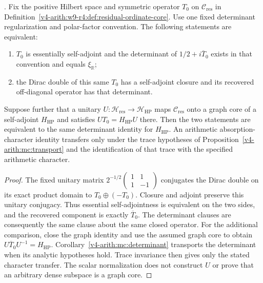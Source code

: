 \begin{theorem}
\label{v4-arith:w9-r4:thm:polyakov-dirac-normal-form}
\ClaimStatusProvedHereConditional. Fix the positive Hilbert space
and symmetric operator $T_0$ on $\mathcal C_{\mathrm{res}}$ in
Definition~\ref{v4-arith:w9-r4:def:residual-ordinate-core}.
Use one fixed determinant regularization and polar-factor convention.
The following statements are equivalent:
\begin{enumerate}
\item $T_0$ is essentially self-adjoint and the determinant of
$1/2+i\overline T_0$ exists in that convention and equals
$\xi_{\mathbb R}$;
\item the Dirac double of this same $T_0$ has a self-adjoint closure
and its recovered off-diagonal operator has that determinant.
\end{enumerate}
Suppose further that a unitary $U:\mathcal H_{\mathrm{res}}
\to\mathcal H_{\mathrm{HP}}$ maps $\mathcal C_{\mathrm{res}}$ onto
a graph core of a self-adjoint $H_{\mathrm{HP}}$ and satisfies
$UT_0=H_{\mathrm{HP}}U$ there. Then the two statements are equivalent
to the same determinant identity for $H_{\mathrm{HP}}$.
An arithmetic absorption-character identity transfers only under
the trace hypotheses of Proposition~\ref{v4-arith:mc:transport}
and the identification of that trace with the specified arithmetic
character.
\end{theorem}
\begin{proof}
The fixed unitary matrix
$2^{-1/2}\left(\begin{smallmatrix}1&1\\1&-1\end{smallmatrix}\right)$
conjugates the Dirac double on its exact product domain to
$T_0\oplus(-T_0)$. Closure and adjoint preserve this unitary
conjugacy. Thus essential self-adjointness is equivalent on the two
sides, and the recovered component is exactly $\overline T_0$.
The determinant clauses are consequently the same clause about
the same closed operator.
For the additional comparison, close the graph identity and use
the assumed graph core to obtain
$U\overline T_0U^{-1}=H_{\mathrm{HP}}$.
Corollary~\ref{v4-arith:mc:determinant} transports the determinant
when its analytic hypotheses hold. Trace invariance then gives
only the stated character transfer. The scalar normalization does
not construct $U$ or prove that an arbitrary dense subspace is a
graph core.
\end{proof}

